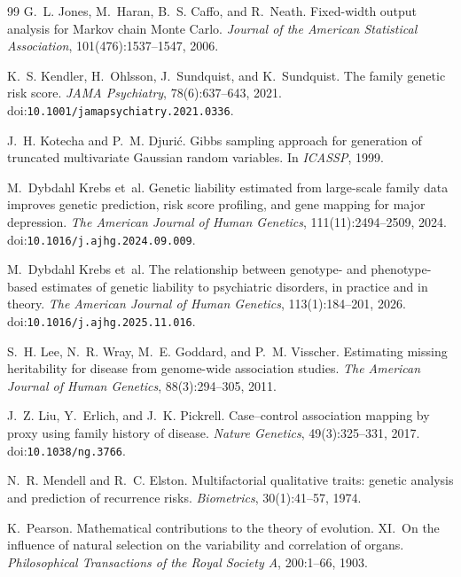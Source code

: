 \documentclass[11pt,a4paper]{article}
\newcommand{\doi}[1]{doi:\allowbreak\texttt{#1}}
\begin{document}
\begin{thebibliography}{99}
G.~L. Jones, M.~Haran, B.~S. Caffo, and R.~Neath.
\newblock Fixed-width output analysis for {M}arkov chain {M}onte {C}arlo.
\newblock \emph{Journal of the American Statistical Association},
  101(476):1537--1547, 2006.

K.~S. Kendler, H.~Ohlsson, J.~Sundquist, and K.~Sundquist.
\newblock The family genetic risk score.
\newblock \emph{JAMA Psychiatry}, 78(6):637--643, 2021.
\newblock \doi{10.1001/jamapsychiatry.2021.0336}.

J.~H. Kotecha and P.~M. Djuri\'c.
\newblock Gibbs sampling approach for generation of truncated multivariate
  {G}aussian random variables.
\newblock In \emph{ICASSP}, 1999.

M.~Dybdahl Krebs et~al.
\newblock Genetic liability estimated from large-scale family data improves
  genetic prediction, risk score profiling, and gene mapping for major
  depression.
\newblock \emph{The American Journal of Human Genetics},
  111(11):2494--2509, 2024.
\newblock \doi{10.1016/j.ajhg.2024.09.009}.

M.~Dybdahl Krebs et~al.
\newblock The relationship between genotype- and phenotype-based estimates
  of genetic liability to psychiatric disorders, in practice and in theory.
\newblock \emph{The American Journal of Human Genetics},
  113(1):184--201, 2026.
\newblock \doi{10.1016/j.ajhg.2025.11.016}.

S.~H. Lee, N.~R. Wray, M.~E. Goddard, and P.~M. Visscher.
\newblock Estimating missing heritability for disease from genome-wide
  association studies.
\newblock \emph{The American Journal of Human Genetics},
  88(3):294--305, 2011.

J.~Z. Liu, Y.~Erlich, and J.~K. Pickrell.
\newblock Case--control association mapping by proxy using family history
  of disease.
\newblock \emph{Nature Genetics}, 49(3):325--331, 2017.
\newblock \doi{10.1038/ng.3766}.

N.~R. Mendell and R.~C. Elston.
\newblock Multifactorial qualitative traits: genetic analysis and
  prediction of recurrence risks.
\newblock \emph{Biometrics}, 30(1):41--57, 1974.

K.~Pearson.
\newblock Mathematical contributions to the theory of evolution.
  {XI}.~{O}n the influence of natural selection on the variability and
  correlation of organs.
\newblock \emph{Philosophical Transactions of the Royal Society A},
  200:1--66, 1903.


\end{thebibliography}
\end{document}

